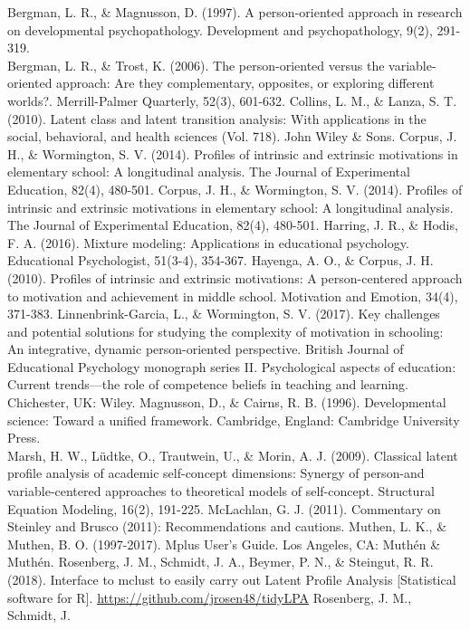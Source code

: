 \documentclass[man]{apa6}
\begin{document}
Bergman, L. R., \& Magnusson, D. (1997). A person-oriented approach in
research on developmental psychopathology. Development and
psychopathology, 9(2), 291-319.\\
Bergman, L. R., \& Trost, K. (2006). The person-oriented versus the
variable-oriented approach: Are they complementary, opposites, or
exploring different worlds?. Merrill-Palmer Quarterly, 52(3), 601-632.
Collins, L. M., \& Lanza, S. T. (2010). Latent class and latent
transition analysis: With applications in the social, behavioral, and
health sciences (Vol. 718). John Wiley \& Sons. Corpus, J. H., \&
Wormington, S. V. (2014). Profiles of intrinsic and extrinsic
motivations in elementary school: A longitudinal analysis. The Journal
of Experimental Education, 82(4), 480-501. Corpus, J. H., \& Wormington,
S. V. (2014). Profiles of intrinsic and extrinsic motivations in
elementary school: A longitudinal analysis. The Journal of Experimental
Education, 82(4), 480-501. Harring, J. R., \& Hodis, F. A. (2016).
Mixture modeling: Applications in educational psychology. Educational
Psychologist, 51(3-4), 354-367. Hayenga, A. O., \& Corpus, J. H. (2010).
Profiles of intrinsic and extrinsic motivations: A person-centered
approach to motivation and achievement in middle school. Motivation and
Emotion, 34(4), 371-383. Linnenbrink-Garcia, L., \& Wormington, S. V.
(2017). Key challenges and potential solutions for studying the
complexity of motivation in schooling: An integrative, dynamic
person-oriented perspective. British Journal of Educational Psychology
monograph series II. Psychological aspects of education: Current
trends---the role of competence beliefs in teaching and learning.
Chichester, UK: Wiley. Magnusson, D., \& Cairns, R. B. (1996).
Developmental science: Toward a unified framework. Cambridge, England:
Cambridge University Press.\\
Marsh, H. W., Lüdtke, O., Trautwein, U., \& Morin, A. J. (2009).
Classical latent profile analysis of academic self-concept dimensions:
Synergy of person-and variable-centered approaches to theoretical models
of self-concept. Structural Equation Modeling, 16(2), 191-225.
McLachlan, G. J. (2011). Commentary on Steinley and Brusco (2011):
Recommendations and cautions. Muthen, L. K., \& Muthen, B. O.
(1997-2017). Mplus User's Guide. Los Angeles, CA: Muthén \& Muthén.
Rosenberg, J. M., Schmidt, J. A., Beymer, P. N., \& Steingut, R. R.
(2018). Interface to mclust to easily carry out Latent Profile Analysis
{[}Statistical software for R{]}.
\url{https://github.com/jrosen48/tidyLPA} Rosenberg, J. M., Schmidt, J.
\end{document}
